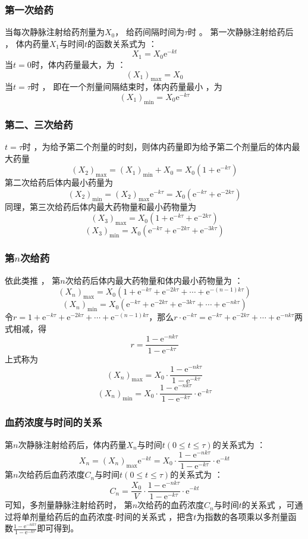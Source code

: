 \documentclass[dvipsnames, svgnames, x11names]{beamer}
\begin{document}
\begin{frame}
	\frametitle{第一次给药}
	当每次静脉注射给药剂量为$X_0$， 给药间隔时间为$\tau$时 。 第一次静脉注射给药后 ， 体内药量$X_1$与时间$t$的函数关系式为 ：
	\[
		X_1 = X_0 \mathrm{e}^{-kt}
	\]
	当$t=0$时，体内药量最大，为 ：
	\[
		(X_1)_{\mathrm{max}} = X_0
	\]
	当$t=\tau$时 ， 即在一个剂量间隔结束时，体内药量最小 ，为
	\[
		(X_1)_{\mathrm{min}} = X_0 \mathrm{e}^{-k\tau}
	\]
\end{frame}


\begin{frame}
	\frametitle{第二、三次给药}
	$t=\tau$时 ，为给予第二个剂量的时刻，则体内药量即为给予第二个剂量后的体内最大药量
	\[
		(X_2)_{\mathrm{max}} = (X_1)_{\mathrm{min}} + X_0 = X_0(1+\mathrm{e}^{-k\tau})
	\]
	第二次给药后体内最小药量为
	\[
		(X_2)_{\mathrm{min}} = (X_2)_{\mathrm{max}}\mathrm{e}^{-k\tau} = X_0(\mathrm{e}^{-k\tau}+\mathrm{e}^{-2k\tau})
	\]
	同理，第三次给药后体内最大药物量和最小药物量为
	\[
		(X_3)_{\mathrm{max}} = X_0(1+\mathrm{e}^{-k\tau}+\mathrm{e}^{-2k\tau})
	\]
	\[
		(X_3)_{\mathrm{min}} = X_0(\mathrm{e}^{-k\tau}+\mathrm{e}^{-2k\tau}+\mathrm{e}^{-3k\tau})
	\]
\end{frame}


\begin{frame}
	\frametitle{第$n$次给药}
	依此类推 ， 第$n$次给药后体内最大药物量和体内最小药物量为 ：
	\[
		(X_n)_{\mathrm{max}} = X_0(1+\mathrm{e}^{-k\tau}+\mathrm{e}^{-2k\tau}+\cdots + \mathrm{e}^{-(n-1)k\tau})
	\]
	\[
		(X_n)_{\mathrm{min}} = X_0(\mathrm{e}^{-k\tau}+\mathrm{e}^{-2k\tau}+\mathrm{e}^{-3k\tau}+\cdots + \mathrm{e}^{-nk\tau})
	\]
	令$r=1+\mathrm{e}^{-k\tau}+\mathrm{e}^{-2k\tau}+\cdots + \mathrm{e}^{-(n-1)k\tau}$，那么$r\cdot \mathrm{e}^{-k\tau}=\mathrm{e}^{-k\tau}+\mathrm{e}^{-2k\tau}+\cdots + \mathrm{e}^{-nk\tau}$两式相减，得
	\[
		r = \frac{1-\mathrm{e}^{-nk\tau}}{1-\mathrm{e}^{-k\tau}}
	\]
	上式称为
	\[
		(X_n)_{\mathrm{max}} = X_0\cdot \frac{1-\mathrm{e}^{-nk\tau}}{1-\mathrm{e}^{-k\tau}}
	\]
	\[
		(X_n)_{\mathrm{min}} = X_0\cdot \frac{1-\mathrm{e}^{-nk\tau}}{1-\mathrm{e}^{-k\tau}}\cdot \mathrm{e}^{-k\tau}
	\]
\end{frame}


\begin{frame}
	\frametitle{血药浓度与时间的关系}
	第$n$次静脉注射给药后，体内药量$X_n$与时间$t(0\leqslant    t\leqslant \tau)$的关系式为 ：
	\[
		X_n = (X_n)_{\mathrm{max}}\mathrm{e}^{-kt} = X_0\cdot \frac{1-\mathrm{e}^{-nk\tau}}{1-\mathrm{e}^{-k\tau}}\cdot \mathrm{e}^{-kt}
	\]
	第$n$次给药后血药浓度$C_n$与时间$t(0\leqslant  t\leqslant \tau)$的关系式为 ：
	\[
		C_n = \frac{X_0}{V}\cdot \frac{1-\mathrm{e}^{-nk\tau}}{1-\mathrm{e}^{-k\tau}}\cdot \mathrm{e}^{-kt}
	\]
	可知，多剂量静脉注射给药时， 第$n$次给药的血药浓度$C_n$与时间$t$的关系式 ，可通过将单剂量给药后的血药浓度-时间的关系式 ，把含$t$为指数的各项乘以多剂量函数$\frac{1-\mathrm{e}^{-nk\tau}}{1-\mathrm{e}^{-k\tau}}$即可得到。
\end{frame}
\end{document}
